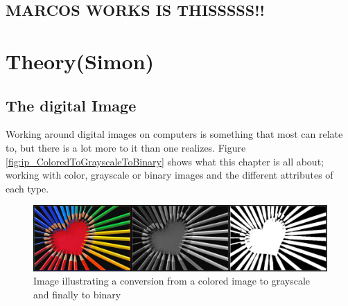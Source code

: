 \section{MARCOS WORKS IS THISSSSS!!}
\chapter{Theory(Simon)}
\section{The digital Image}
Working around digital images on computers is something that most can relate to, but there is a lot more to it than one realizes. Figure \eqref{fig:ip_ColoredToGrayscaleToBinary} shows what this chapter is all about; working with color, grayscale or binary images and the different attributes of each type.

\begin{figure}[htbp]
\centering
\includegraphics[width=1.00\textwidth]{Pictures/Theory/ColoredToGrayscaleToBinary.jpg}
\caption{Image illustrating a conversion from a colored image to grayscale and finally to binary}
\label{fig:ip_ColoredToGrayscaleToBinary}
\end{figure}

